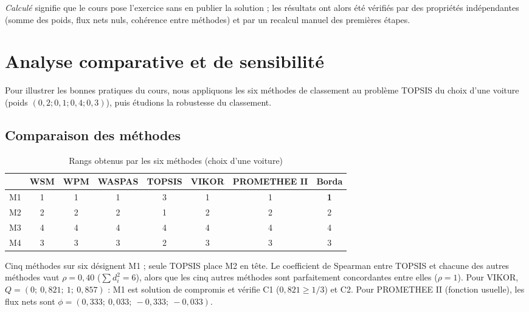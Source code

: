 \documentclass[11pt,a4paper]{report}
\theoremstyle{definition}
\theoremstyle{remark}
\begin{document}
\noindent\emph{Calculé} signifie que le cours pose l'exercice sans en publier la solution ; les résultats ont
alors été vérifiés par des propriétés indépendantes (somme des poids, flux nets nuls, cohérence entre
méthodes) et par un recalcul manuel des premières étapes.

\chapter{Analyse comparative et de sensibilité}\label{ch:comparaison}

Pour illustrer les bonnes pratiques du cours, nous appliquons les six méthodes de classement au problème
TOPSIS du choix d'une voiture (poids $(0{,}2;0{,}1;0{,}4;0{,}3)$), puis étudions la robustesse du
classement.

\section{Comparaison des méthodes}

\begin{table}[H]
\centering
\caption{Rangs obtenus par les six méthodes (choix d'une voiture)}\label{tab:comparaison}
\begin{tabular}{lcccccc|c}
\toprule
 & WSM & WPM & WASPAS & TOPSIS & VIKOR & PROMETHEE II & Borda\\
\midrule
M1 & 1 & 1 & 1 & 3 & 1 & 1 & \textbf{1}\\
M2 & 2 & 2 & 2 & 1 & 2 & 2 & 2\\
M3 & 4 & 4 & 4 & 4 & 4 & 4 & 4\\
M4 & 3 & 3 & 3 & 2 & 3 & 3 & 3\\
\bottomrule
\end{tabular}
\end{table}

Cinq méthodes sur six désignent M1 ; seule TOPSIS place M2 en tête. Le coefficient de Spearman entre TOPSIS
et chacune des autres méthodes vaut $\rho=0{,}40$ ($\sum d_i^2=6$), alors que les cinq autres méthodes
sont parfaitement concordantes entre elles ($\rho=1$). Pour VIKOR, $Q=(0;\ 0{,}821;\ 1;\ 0{,}857)$ :
M1 est solution de compromis et vérifie C1 ($0{,}821\ge 1/3$) et C2. Pour PROMETHEE II (fonction
usuelle), les flux nets sont $\phi=(0{,}333;\ 0{,}033;\ -0{,}333;\ -0{,}033)$.
\end{document}
